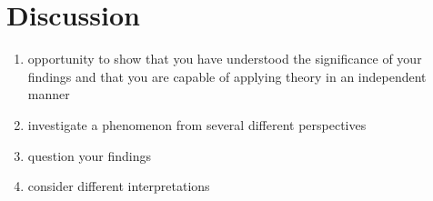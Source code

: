 
\section{Discussion}
\label{sec:disc}

\begin{enumerate}
    \item opportunity to show that you have understood the significance of your findings and that you are capable of applying theory in an independent manner
    \item investigate a phenomenon from several different perspectives
    \item question your findings
    \item consider different interpretations
\end{enumerate}